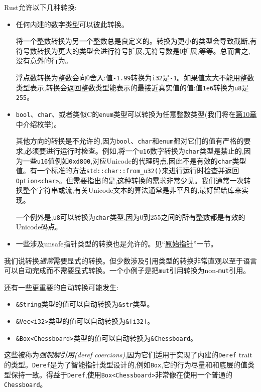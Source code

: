 Rust允许以下几种转换:
\begin{itemize}
    \item 任何内建的数字类型可以彼此转换。
    
    将一个整数转换为另一个整数总是良定义的。转换为更小的类型会导致截断,有符号数转换为更大的类型会进行符号扩展,无符号数是0扩展,等等。总而言之,没有意外的行为。

    浮点数转换为整数会向0舍入:值\texttt{-1.99}转换为\texttt{i32}是\texttt{-1}。如果值太大不能用整数类型表示,转换会返回整数类型能表示的最接近真实值的值:值\texttt{1e6}转换为\texttt{u8}是\texttt{255}。

    \item \texttt{bool}、\texttt{char}、或者类似C的\texttt{enum}类型可以转换为任意整数类型(我们将在\hyperref[ch10]{第10章}中介绍枚举)。
    
    其他方向的转换是不允许的,因为\texttt{bool}、\texttt{char}和\texttt{enum}都对它们的值有严格的要求,必须要进行运行时检查。例如,将一个\texttt{u16}数字转换为\texttt{char}类型是禁止的,因为一些\texttt{u16}值例如\texttt{0xd800},对应Unicode的代理码点,因此不是有效的\texttt{char}类型值。有一个标准的方法\texttt{std::char::from\_u32()}来进行运行时检查并返回\texttt{Option<char>}。但需要指出的是,这种转换的需求非常少见。我们通常一次转换整个字符串或流,有关Unicode文本的算法通常是非平凡的,最好留给库来实现。

    一个例外是,\texttt{u8}可以转换为\texttt{char}类型,因为0到255之间的所有整数都是有效的Unicode码点。

    \item 一些涉及unsafe指针类型的转换也是允许的。见“\hyperref[rawp]{原始指针}”一节。
\end{itemize}

我们说转换\emph{通常}需要显式的转换。但少数涉及引用类型的转换非常直观以至于语言可以自动完成而不需要显式转换。一个小例子是把\texttt{mut}引用转换为non-\texttt{mut}引用。

还有一些更重要的自动转换可能发生:
\begin{itemize}
    \item \texttt{\&String}类型的值可以自动转换为\texttt{\&str}类型。
    \item \texttt{\&Vec<i32>}类型的值可以自动转换为\texttt{\&[i32]}。
    \item \texttt{\&Box<Chessboard>}类型的值可以自动转换为\texttt{\&Chessboard}。
\end{itemize}

这些被称为\emph{强制解引用(deref coercions)},因为它们适用于实现了内建的\texttt{Deref} trait的类型。\texttt{Deref}是为了智能指针类型设计的,例如\texttt{Box},它的行为尽量和和底层的值类型保持一致。得益于\texttt{Deref},使用\texttt{Box<Chessboard>}非常像在使用一个普通的\texttt{Chessboard}。

